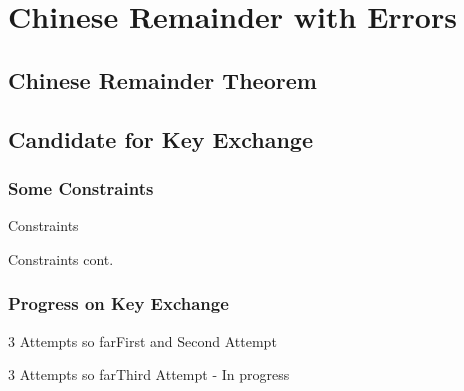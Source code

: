 \documentclass{beamer}
\begin{document}
\section{Chinese Remainder with Errors}

    \subsection{Chinese Remainder Theorem}





    \subsection{Candidate for Key Exchange}
        \subsubsection{Some Constraints}


        \begin{frame}{Constraints}


        \end{frame}


        \begin{frame}{Constraints cont.}



        \end{frame}

        \subsubsection{Progress on Key Exchange}


        \begin{frame}{3 Attempts so far}{First and Second Attempt}

        \end{frame}


        \begin{frame}{3 Attempts so far}{Third Attempt - In progress}



        \end{frame}
\end{document}
